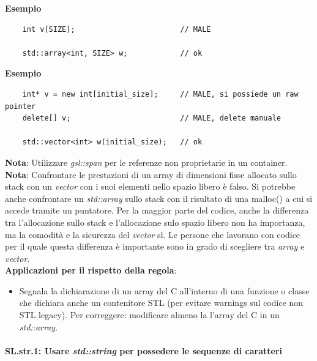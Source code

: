 \textsf{\small \textbf{Esempio}}

\begin{lstlisting}
	int v[SIZE];                        // MALE
	
	std::array<int, SIZE> w;            // ok
\end{lstlisting}

\textsf{\small \textbf{Esempio}}

\begin{lstlisting}
	int* v = new int[initial_size];     // MALE, si possiede un raw pointer
	delete[] v;                         // MALE, delete manuale
	
	std::vector<int> w(initial_size);   // ok
\end{lstlisting}

\textsf{\small \textbf{Nota}: Utilizzare \emph{gsl::span} per le referenze non proprietarie in un container.} \\

\textsf{\small \textbf{Nota}: Confrontare le prestazioni di un array di dimensioni fisse allocato sullo stack con un \emph{vector} con i suoi elementi nello spazio libero è falso. Si potrebbe anche confrontare un \emph{std::array} sullo stack con il risultato di una malloc() a cui si accede tramite un puntatore. Per la maggior parte del codice, anche la differenza tra l'allocazione sullo stack e l'allocazione sulo spazio libero non ha importanza, ma la comodità e la sicurezza del \emph{vector} sì. Le persone che lavorano con codice per il quale questa differenza è importante sono in grado di scegliere tra \emph{array} e \emph{vector}.} \\

\textsf{\small \textbf{Applicazioni per il rispetto della regola}: }

\begin{itemize}
	\item \textsf{\small Segnala la dichiarazione di un array del C all'interno di una funzione o classe che dichiara anche un contenitore STL (per evitare warnings sul codice non STL legacy). Per correggere: modificare almeno la l'array del C in un \emph{std::array}.}
\end{itemize}


\paragraph{SL.str.1: Usare \emph{std::string} per possedere le sequenze di caratteri}

